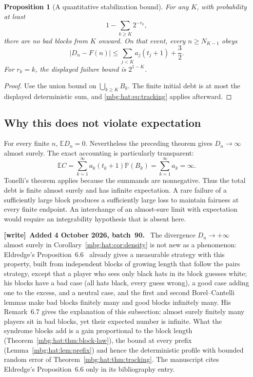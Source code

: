 \documentclass[11pt,letterpaper]{article}
\newtheorem{proposition}[theorem]{Proposition}
\theoremstyle{definition}
\newcommand{\E}{\mathbb E}
\newcommand{\Prb}{\mathbb P}
\newenvironment{writenote}[1][]{\par\smallskip\begingroup\small
 \noindent\textbf{[write]}\if\relax\detokenize{#1}\relax\else~\textbf{#1.}\fi\ }%
 {\par\endgroup\smallskip}
\begin{document}
\begin{proposition}[A quantitative stabilization bound]\label{mbg:hat:prop:confidence}
For any \(K\), with probability at least
\[
  1-\sum_{k\ge K}2^{-r_k},
\]
there are no bad blocks from \(K\) onward. On that event, every
\(n\ge N_{K-1}\) obeys
\[
  |D_n-F(n)|\le \sum_{j<K}a_j(t_j+1)+\frac32.
\]
For \(r_k=k\), the displayed failure bound is \(2^{1-K}\).
\end{proposition}
\begin{proof}
Use the union bound on \(\bigcup_{k\ge K}B_k\). The finite initial
debt is at most the displayed deterministic sum, and
\eqref{mbg:hat:eq:tracking} applies afterward.
\end{proof}

\subsection{Why this does not violate expectation}

For every finite \(n\), \(\E D_n=0\). Nevertheless the preceding
theorem gives \(D_n\to\infty\) almost surely. The exact accounting is
particularly transparent:
\[
  \E C
  =\sum_{k=1}^\infty a_k(t_k+1)\Prb(B_k)
  =\sum_{k=1}^\infty a_k
  =\infty.                                                \tag{22.6}\label{mbg:hat:eq:infinite-debt}
\]
Tonelli's theorem applies because the summands are nonnegative.
Thus the total debt is finite almost surely and has infinite
expectation. A rare failure of a sufficiently large block produces
a sufficiently large loss to maintain fairness at every finite
endpoint. An interchange of an almost-sure limit with expectation
would require an integrability hypothesis that is absent here.

\begin{writenote}[Added 4 October 2026, batch~90]
The divergence $D_n\to+\infty$ almost surely in Corollary~\ref{mbg:hat:cor:density} is not new as a phenomenon: Eldredge's Proposition~6.6~\cite{hat:Eldredge} already gives a measurable strategy with this property, built from independent blocks of growing length that follow the pairs strategy, except that a player who sees only black hats in its block guesses white; his blocks have a bad case (all hats black, every guess wrong), a good case adding one to the excess, and a neutral case, and the first and second Borel--Cantelli lemmas make bad blocks finitely many and good blocks infinitely many. His Remark~6.7 gives the explanation of this subsection: almost surely finitely many players sit in bad blocks, yet their expected number is infinite. What the syndrome blocks add is a gain proportional to the block length (Theorem~\ref{mbg:hat:thm:block-law}), the bound at every prefix (Lemma~\ref{mbg:hat:lem:prefix}) and hence the deterministic profile with bounded random error of Theorem~\ref{mbg:hat:thm:tracking}. The manuscript cites Eldredge's Proposition~6.6 only in its bibliography entry.
\end{writenote}
\end{document}
